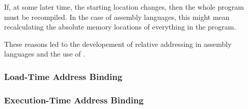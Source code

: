 If, at some later time, the starting location changes, then the whole program must be recompiled.
In the case of assembly languages, this might mean recalculating the absolute memory locations of everything in the program.

These reasons led to the developement of relative addressing in assembly languages and the use of .

\subsubsection{Load-Time Address Binding}\label{subsubsec:Load_Time_Address_Binding}
\subsubsection{Execution-Time Address Binding}\label{subsubsec:Execution_Time_Address_Binding}

